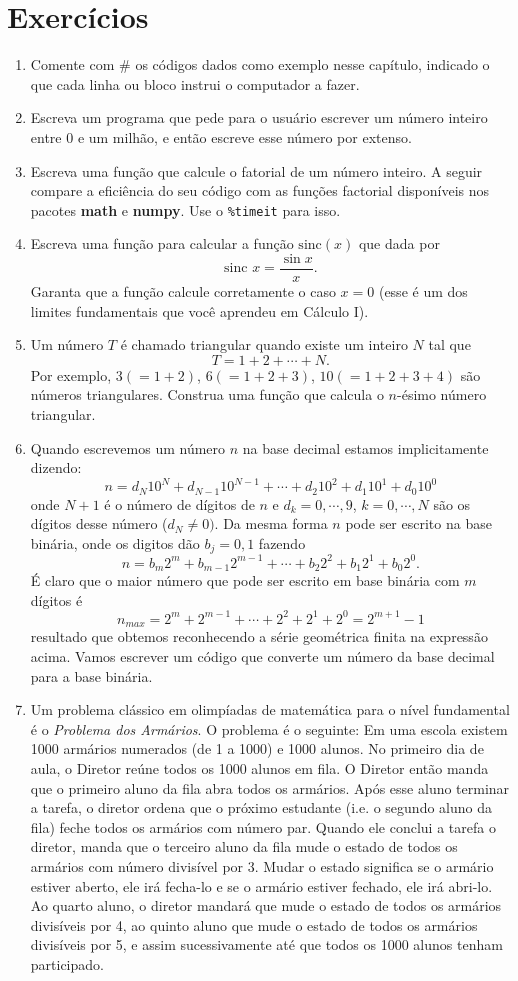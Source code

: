 \section{Exercícios}
\begin{enumerate}
    \item Comente com $\#$ os códigos dados como exemplo nesse capítulo, indicado o que cada linha ou bloco instrui o computador a fazer.
    \item Escreva um programa que pede para o usuário escrever um número inteiro entre $0$ e um milhão, e então escreve esse número por extenso.
    \item Escreva uma função que calcule o fatorial de um número inteiro. A seguir compare a eficiência do seu código com as funções factorial disponíveis nos pacotes {\bf math} e {\bf numpy}. Use o {\tt \%timeit} para isso.
    \item Escreva uma função para calcular a função $\text{sinc}(x)$ que dada por
    \[ \text{sinc } x = \frac{\sin x}{x}.\]
    Garanta que a função calcule corretamente o caso $x=0$ (esse é um dos limites fundamentais que você aprendeu em Cálculo I).
    \item Um número $T$ é chamado triangular quando existe um inteiro $N$ tal que
    \[ T = 1+2+ \cdots+ N.\]
    Por exemplo, $3(=1+2)$, $6(=1+2+3)$, $10(=1+2+3+4)$ são números triangulares. Construa uma função que calcula o $n$-ésimo número triangular.
    \item  Quando escrevemos um número $n$ na base decimal estamos implicitamente dizendo:
\[ n = d_N 10^N + d_{N-1} 10^{N-1} + \cdots + d_2 10^2 + d_1 10^1 + d_0 10^0 \]
onde $N+1$ é o número de dígitos de $n$ e $d_k = 0,\cdots,9$, $k=0,\cdots,N$ são os dígitos desse número ($d_N \neq 0)$. Da mesma forma $n$ pode ser escrito na base binária, onde os digitos dão $b_j = 0,1 $ fazendo
\[ n = b_m 2^m + b_{m-1} 2^{m-1}+ \cdots + b_2 2^2 + b_1 2^1 + b_0 2^0. \]
É claro que o maior número que pode ser escrito em base binária com $m$ dígitos é
\[ n_{max} = 2^m + 2^{m-1}+ \cdots + 2^2 + 2^1 +  2^0 = 2^{m+1}-1 \]
resultado que obtemos reconhecendo a série geométrica finita na expressão acima. Vamos escrever um código que converte um número da base decimal para a base binária.
    \item Um problema clássico em olimpíadas de matemática para o nível fundamental é o {\it Problema dos Armários}. O problema é o seguinte: Em uma escola existem 1000 armários numerados (de 1 a 1000) e 1000 alunos. No primeiro dia de aula, o Diretor reúne todos os 1000 alunos em fila. O Diretor então manda que o primeiro aluno da fila abra todos os armários. Após esse aluno terminar a tarefa, o diretor ordena que o próximo estudante (i.e. o segundo aluno da fila) feche todos os armários com número par. Quando ele conclui a tarefa o diretor, manda que o terceiro aluno da fila mude o estado de todos os armários com número divisível por 3. Mudar o estado significa se o armário estiver aberto, ele irá fecha-lo e se o armário estiver fechado, ele irá abri-lo. Ao quarto aluno, o diretor mandará que mude o estado de todos os armários divisíveis por 4, ao quinto aluno que mude o estado de todos os armários divisíveis por 5, e assim sucessivamente até que todos os 1000 alunos tenham participado.

\end{enumerate}
